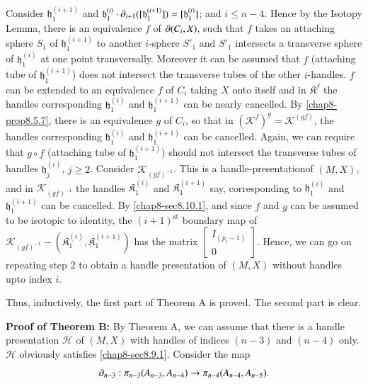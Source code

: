 \begin{step}%
Consider $\mathfrak{h}^{(i+1)}_{1}$ and $\mathfrak{h}^{(i)}_{1}\cdot \partial_{i+1}([\mathfrak{h}^{(i+1)}_{1}])=[\mathfrak{h}^{(i)}_{1}]$; and $i\leq n-4$. Hence by the Isotopy Lemma, there is an equivalence $f$ of $\partial(C_{i},X)$, such that $f$ takes an attaching sphere $S_{1}$ of $\mathfrak{h}_{1}^{(i+1)}$ to another $i$-sphere $S'_{1}$ and $S'_{1}$ intersects a transverse sphere of $\mathfrak{h}^{(i)}_{1}$ at one point transversally. Moreover it can be assumed that $f$ (attaching tube of $\mathfrak{h}^{(i+1)}_{1}$) does not intersect the transverse tubes of the other          $i$-handles. $f$ can be extended to an equivalence $f$ of $C_{i}$ taking $X$ onto itself and in $\mathfrak{K}^{f}$ the handles corresponding $\mathfrak{h}^{(i)}_{1}$ and $\mathfrak{h}^{(i+1)}_{1}$ can be nearly cancelled. By \ref{chap8-prop8.5.7}, there is an equivalence $g$ of $C_{i}$, so that in $(\mathscr{K}^{f})^{g}=\mathscr{K}^{(gf)}$, the handles corresponding $\mathfrak{h}^{(i)}_{1}$ and $\mathfrak{h}^{(i+1)}_{1}$ can be cancelled. Again, we can require that $g\circ f$ (attaching tube of $\mathfrak{h}^{(i+1)}_{1}$) should not intersect the transverse tubes of handles $\mathfrak{h}^{(i)}_{j}$, $j\geq 2$. Consider $\mathscr{K}_{{(gf)^{-1}}}$. This is a handle-presentation\pageoriginale of $(M,X)$, and in $\mathscr{K}_{(gf)^{-1}}$ the handles $\mathfrak{K}^{(i)}_{1}$ and $\mathfrak{K}^{(i+1)}_{1}$ say, corresponding to $\mathfrak{h}^{(i)}_{1}$ and $\mathfrak{h}^{(i+1)}_{1}$ can be cancelled. By \ref{chap8-sec8.10.1}, and since $f$ and $g$ can be assumed to be isotopic to identity, the $(i+1)^{\text{st}}$ boundary map of $\mathscr{K}_{(gf)^{-1}}-(\mathfrak{K}^{(i)}_{1},\mathfrak{K}^{(i+1)}_{1})$ has the matrix $\left[\begin{smallmatrix}I_{(p_{i}-1)}\\ 0\end{smallmatrix}\right]$. Hence, we can go on repeating step 2 to obtain a handle presentation of $(M,X)$ without handles upto index $i$.

Thus, inductively, the first part of Theorem A is proved. The second part is clear.
\end{step}


\noindent
{\bf Proof of Theorem B:} By Theorem A, we can assume that there is a handle presentation $\mathscr{H}$ of $(M,X)$ with handles of indices $(n-3)$ and $(n-4)$ only. $\mathscr{H}$ obviously satisfies \ref{chap8-sec8.9.1}. Consider the map
$$
\partial_{n-3}:\pi_{n-3}(A_{n-3},A_{n-4})\to \pi_{n-4}(A_{n-4},A_{n-5}).
$$

